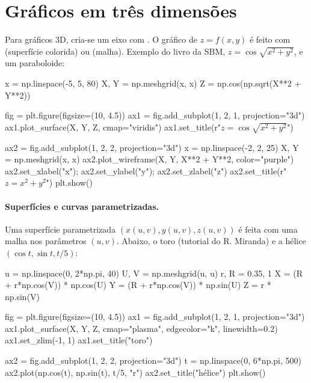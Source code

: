 \section{Gráficos em três dimensões}

Para gráficos 3D, cria-se um eixo com . O gráfico de $z=f(x,y)$ é feito com
 (superfície colorida) ou  (malha). Exemplo do livro
da SBM, $z=\cos\sqrt{x^2+y^2}$, e um paraboloide:

\begin{entrada}
x = np.linspace(-5, 5, 80)
X, Y = np.meshgrid(x, x)
Z = np.cos(np.sqrt(X**2 + Y**2))

fig = plt.figure(figsize=(10, 4.5))
ax1 = fig.add_subplot(1, 2, 1, projection="3d")
ax1.plot_surface(X, Y, Z, cmap="viridis")
ax1.set_title(r"$z=\cos\sqrt{x^2+y^2}$")

ax2 = fig.add_subplot(1, 2, 2, projection="3d")
x = np.linspace(-2, 2, 25)
X, Y = np.meshgrid(x, x)
ax2.plot_wireframe(X, Y, X**2 + Y**2, color="purple")
ax2.set_xlabel("x"); ax2.set_ylabel("y"); ax2.set_zlabel("z")
ax2.set_title(r"$z=x^2+y^2$")
plt.show()
\end{entrada}


\paragraph{Superfícies e curvas parametrizadas.} Uma superfície parametrizada $(x(u,v), y(u,v), z(u,v))$ é feita
com uma malha nos parâmetros $(u,v)$. Abaixo, o toro (tutorial do R. Miranda) e a hélice $(\cos t, \sin t, t/5)$:

\begin{entrada}
u = np.linspace(0, 2*np.pi, 40)
U, V = np.meshgrid(u, u)
r, R = 0.35, 1
X = (R + r*np.cos(V)) * np.cos(U)
Y = (R + r*np.cos(V)) * np.sin(U)
Z = r * np.sin(V)

fig = plt.figure(figsize=(10, 4.5))
ax1 = fig.add_subplot(1, 2, 1, projection="3d")
ax1.plot_surface(X, Y, Z, cmap="plasma", edgecolor="k", linewidth=0.2)
ax1.set_zlim(-1, 1)
ax1.set_title("toro")

ax2 = fig.add_subplot(1, 2, 2, projection="3d")
t = np.linspace(0, 6*np.pi, 500)
ax2.plot(np.cos(t), np.sin(t), t/5, "r")
ax2.set_title("hélice")
plt.show()
\end{entrada}

